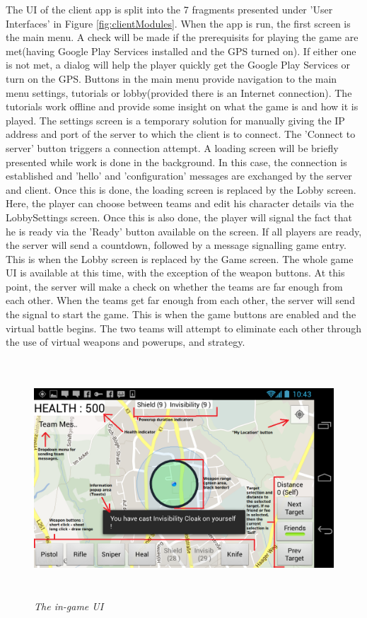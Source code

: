 The UI of the client app is split into the 7 fragments presented under 'User
Interfaces' in Figure \ref{fig:clientModules}. When the app is run, the first
screen is the main menu. A check will be made if the prerequisits for
playing the game are met(having Google Play Services installed and the
GPS turned on). If either one is not met, a dialog will help the player
quickly get the Google Play Services or turn on the GPS. Buttons in the main
menu provide navigation to the main menu settings, tutorials or lobby(provided
there is an Internet connection). The tutorials work offline and provide some
insight on what the game is and how it is played. The settings screen is a
temporary solution for manually giving the IP address and port of the server to
which the client is to connect. The 'Connect to server' button triggers a
connection attempt. A loading screen will be briefly presented while work is
done in the background. In this case, the connection is established and 'hello'
and 'configuration' messages are exchanged by the server and client. Once this
is done, the loading screen is replaced by the Lobby screen. Here, the player
can choose between teams and edit his character details via the LobbySettings
screen. Once this is also done, the player will signal the fact that he is ready
via the 'Ready' button available on the screen. If all players are ready, the
server will send a countdown, followed by a message signalling game entry. This
is when the Lobby screen is replaced by the Game screen. The whole game UI is
available at this time, with the exception of the weapon buttons. At this point,
the server will make a check on whether the teams are far enough from each
other. When the teams get far enough from each other, the server will send the
signal to start the game. This is when the game buttons are enabled and the
virtual battle begins. The two teams will attempt to eliminate each other
through the use of virtual weapons and powerups, and strategy.\newline


\begin{figure}
\includegraphics[height=3.5in,width=6.23in]{./images/android_screenshots/tutorial_game.png}  
\caption{\small \sl The in-game UI \label{fig:game_ui}}
\end{figure}


